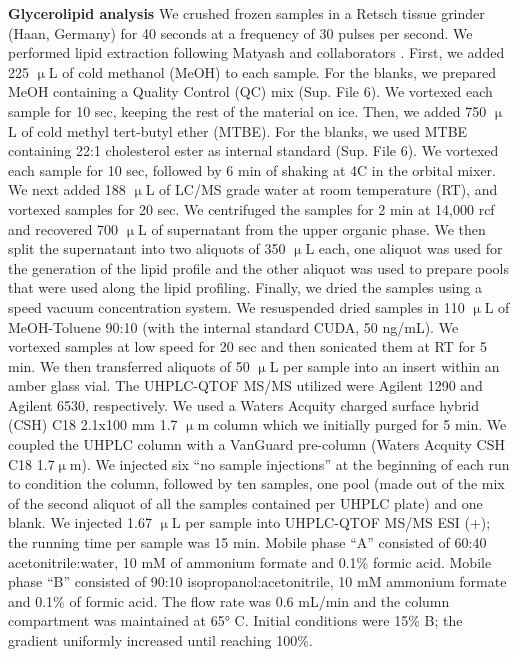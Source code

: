 \documentclass[9pt,twocolumn,twoside,lineno]{BioRxiv}
\begin{document}
\textbf{Glycerolipid analysis} 
We crushed frozen samples in a Retsch tissue grinder (Haan, Germany) for 40 seconds at a frequency of 30 pulses per second. 
We performed lipid extraction following Matyash and collaborators \cite{Matyash2008-ue}. 
First, we added 225 $\upmu$L of cold methanol (MeOH) to each sample. 
For the blanks, we prepared MeOH containing a Quality Control (QC) mix (Sup. File 6).
We vortexed each sample for 10 sec, keeping the rest of the material on ice. 
Then, we added 750 $\upmu$L of cold methyl tert-butyl ether (MTBE). 
For the blanks, we used MTBE containing 22:1 cholesterol ester as internal standard (Sup. File 6). 
We vortexed each sample for 10 sec, followed by 6 min of shaking at 4\degree C in the orbital mixer. 
We next added 188 $\upmu$L of LC/MS grade water at room temperature (RT), and vortexed samples for 20 sec.
We centrifuged the samples for 2 min at 14,000 rcf and recovered 700 $\upmu$L of supernatant from the upper organic phase. 
We then split the supernatant into two aliquots of 350 $\upmu$L each, one aliquot was used for the generation of the lipid profile and the other aliquot was used to prepare pools that were used along the lipid profiling. 
Finally, we dried the samples using a speed vacuum concentration system.
We resuspended dried samples in 110 $\upmu$L of MeOH-Toluene 90:10 (with the internal standard CUDA, 50 ng/mL). 
We vortexed samples at low speed for 20 sec and then sonicated them at RT for 5 min. 
We then transferred aliquots of 50 $\upmu$L per sample into an insert within an amber glass vial.
The UHPLC-QTOF MS/MS utilized were Agilent 1290 and Agilent 6530, respectively. 
We used a Waters Acquity charged surface hybrid (CSH) C18 2.1x100 mm 1.7 $\upmu$m column which we initially purged for 5 min. 
We coupled the UHPLC column with a VanGuard pre-column (Waters Acquity CSH C18 1.7$\upmu$m). 
We injected six “no sample injections” at the beginning of each run to condition the column, followed by ten samples, one pool (made out of the mix of the second aliquot of all the samples contained per UHPLC plate) and one blank.
We injected 1.67 $\upmu$L per sample into UHPLC-QTOF MS/MS ESI (+); the running time per sample was 15 min. 
Mobile phase “A” consisted of 60:40 acetonitrile:water, 10 mM of ammonium formate and 0.1\% formic acid. 
Mobile phase “B” consisted of 90:10 isopropanol:acetonitrile, 10 mM ammonium formate and 0.1\% of formic acid. 
The flow rate was 0.6 mL/min and the column compartment was maintained at 65° C. Initial conditions were 15\% B; the gradient uniformly increased until reaching 100\%. 
\end{document}
